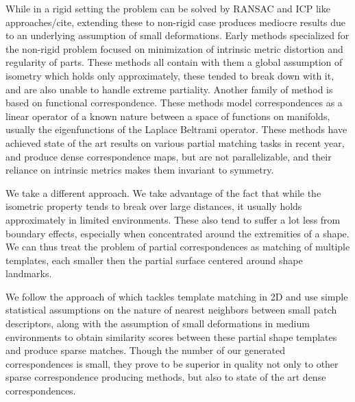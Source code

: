 \documentclass[10pt,twocolumn,letterpaper]{article}
\begin{document}
While in a rigid setting the problem can be solved by RANSAC and ICP like approaches/cite, extending these to non-rigid case produces mediocre results due to an underlying assumption of small deformations. 
Early methods specialized for the non-rigid problem focused on minimization of intrinsic metric distortion\cite{bronstein2006generalized,Torsello:2012:GAD:2354409.2354702,Rodola:2013:ENC:2586117.2587323} and regularity of parts\cite{Bronstein:2009:PSO:1553357.1553368,bronstein2008not}. These methods all contain with them a global assumption of isometry which holds only approximately, these tended to break down with it, and are also unable to handle extreme partiality. 
Another family of method is based on functional correspondence. These methods model correspondences as a linear operator of a known nature between a space of functions on manifolds, usually the eigenfunctions of the Laplace Beltrami operator\cite{Ovsjanikov:2012:FMF:2185520.2185526,litany2017fully,vestner2017efficient,rodola2017partial}. These methods have achieved state of the art results on various partial matching tasks in recent year, and produce dense correspondence maps, but are not parallelizable, and their reliance on intrinsic metrics makes them invariant to symmetry. 

We take a different approach. We take advantage of the fact that while the isometric property tends to break over large distances, it usually holds approximately in limited environments. These also tend to suffer a lot less from boundary effects, especially when concentrated around the extremities of a shape. 
We can thus treat the problem of partial correspondences as matching of multiple templates, each smaller then the partial surface centered around shape landmarks. 

We follow the approach of\cite{talmi2017template} which tackles template matching in 2D and use simple statistical assumptions on the nature of nearest neighbors between small patch descriptors, along with the assumption of small deformations in medium environments to obtain similarity scores between these partial shape templates and produce sparse matches.
Though the number of our generated correspondences is small, they prove to be superior in quality not only to other sparse correspondence producing methods, but also to state of the art dense correspondences. 
\end{document}
